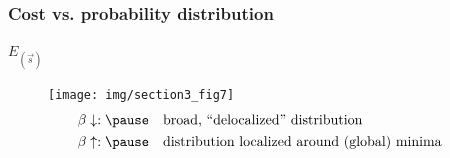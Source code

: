 \begin{frame}\frametitle{Cost vs. probability distribution}

$E_{(\vec{s})}$
\vspace{-0.2cm}
\begin{figure}[h]
  \centering
\texttt{[image: img/section3\_fig7]}  
\[ \begin{array}{ll}
	\beta \downarrow:\pause
	& \text{broad, ``delocalized'' distribution} \\\vspace{-0.3cm}\\
	\beta \uparrow:\pause
	& \text{distribution localized around (global) minima}
\end{array} \]
\end{figure}


\end{frame}


